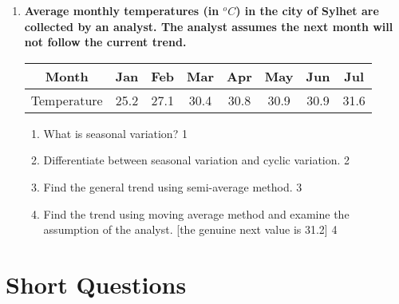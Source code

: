 \documentclass[a4paper,oneside]{book}
\begin{document}
\begin{enumerate}
 \item
	  \textbf{Average monthly temperatures (in $^o C$) in the city of Sylhet are collected by an analyst. The analyst assumes the next month will not follow the current trend.} 
	  
	  \begin{table}[h]
	  \centering
\begin{tabular}{c|c|c|c|c|c|c|c}
Month & Jan & Feb & Mar & Apr & May & Jun & Jul \\ \hline
Temperature & 25.2 & 27.1 & 30.4 & 30.8 & 30.9 & 30.9 & 31.6
\end{tabular}
\end{table}
  
  \begin{enumerate}
    \item
	What is seasonal variation? \hfill 1
    \item
	Differentiate between seasonal variation and cyclic variation. \hfill 2
    \item  
	Find the general trend using semi-average method. \hfill 3
    \item
	Find the trend using moving average method and examine the assumption of the analyst. [the genuine next value is 31.2] \hfill 4
  \end{enumerate}

\end{enumerate}

\section{Short Questions}
\end{document}
